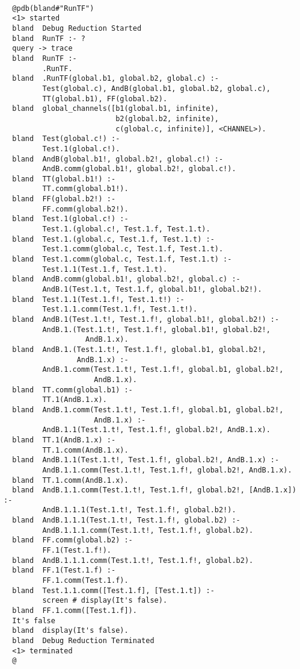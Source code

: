 \begin{verbatim}

  @pdb(bland#"RunTF")
  <1> started
  bland  Debug Reduction Started
  bland  RunTF :- ?
  query -> trace
  bland  RunTF :- 
         .RunTF.
  bland  .RunTF(global.b1, global.b2, global.c) :- 
         Test(global.c), AndB(global.b1, global.b2, global.c),
         TT(global.b1), FF(global.b2).
  bland  global_channels([b1(global.b1, infinite),
                          b2(global.b2, infinite),
                          c(global.c, infinite)], <CHANNEL>).
  bland  Test(global.c!) :- 
         Test.1(global.c!).
  bland  AndB(global.b1!, global.b2!, global.c!) :- 
         AndB.comm(global.b1!, global.b2!, global.c!).
  bland  TT(global.b1!) :- 
         TT.comm(global.b1!).
  bland  FF(global.b2!) :- 
         FF.comm(global.b2!).
  bland  Test.1(global.c!) :- 
         Test.1.(global.c!, Test.1.f, Test.1.t).
  bland  Test.1.(global.c, Test.1.f, Test.1.t) :- 
         Test.1.comm(global.c, Test.1.f, Test.1.t).
  bland  Test.1.comm(global.c, Test.1.f, Test.1.t) :- 
         Test.1.1(Test.1.f, Test.1.t).
  bland  AndB.comm(global.b1!, global.b2!, global.c) :- 
         AndB.1(Test.1.t, Test.1.f, global.b1!, global.b2!).
  bland  Test.1.1(Test.1.f!, Test.1.t!) :- 
         Test.1.1.comm(Test.1.f!, Test.1.t!).
  bland  AndB.1(Test.1.t!, Test.1.f!, global.b1!, global.b2!) :- 
         AndB.1.(Test.1.t!, Test.1.f!, global.b1!, global.b2!,
                   AndB.1.x).
  bland  AndB.1.(Test.1.t!, Test.1.f!, global.b1, global.b2!,
                 AndB.1.x) :- 
         AndB.1.comm(Test.1.t!, Test.1.f!, global.b1, global.b2!,
                     AndB.1.x).
  bland  TT.comm(global.b1) :- 
         TT.1(AndB.1.x).
  bland  AndB.1.comm(Test.1.t!, Test.1.f!, global.b1, global.b2!,
                     AndB.1.x) :- 
         AndB.1.1(Test.1.t!, Test.1.f!, global.b2!, AndB.1.x).
  bland  TT.1(AndB.1.x) :- 
         TT.1.comm(AndB.1.x).
  bland  AndB.1.1(Test.1.t!, Test.1.f!, global.b2!, AndB.1.x) :- 
         AndB.1.1.comm(Test.1.t!, Test.1.f!, global.b2!, AndB.1.x).
  bland  TT.1.comm(AndB.1.x).
  bland  AndB.1.1.comm(Test.1.t!, Test.1.f!, global.b2!, [AndB.1.x]) :- 
         AndB.1.1.1(Test.1.t!, Test.1.f!, global.b2!).
  bland  AndB.1.1.1(Test.1.t!, Test.1.f!, global.b2) :- 
         AndB.1.1.1.comm(Test.1.t!, Test.1.f!, global.b2).
  bland  FF.comm(global.b2) :- 
         FF.1(Test.1.f!).
  bland  AndB.1.1.1.comm(Test.1.t!, Test.1.f!, global.b2).
  bland  FF.1(Test.1.f) :- 
         FF.1.comm(Test.1.f).
  bland  Test.1.1.comm([Test.1.f], [Test.1.t]) :- 
         screen # display(It's false).
  bland  FF.1.comm([Test.1.f]).
  It's false
  bland  display(It's false).
  bland  Debug Reduction Terminated
  <1> terminated
  @
\end{verbatim}

